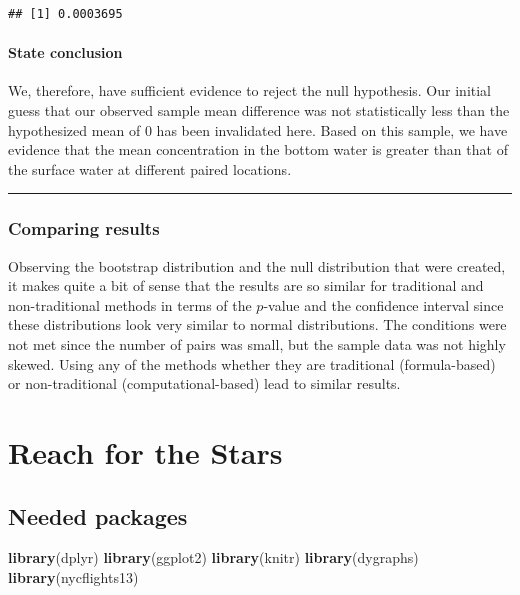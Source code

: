 \documentclass[]{tufte-book}
\newenvironment{Shaded}{\begin{snugshade}}{\end{snugshade}}
\newcommand{\KeywordTok}[1]{\textcolor[rgb]{0.13,0.29,0.53}{\textbf{{#1}}}}
\newcommand{\NormalTok}[1]{{#1}}
\let\oldrule=\rule
\renewcommand{\rule}[1]{\oldrule{\linewidth}}
\theoremstyle{definition}
\theoremstyle{definition}
\theoremstyle{remark}
\begin{document}
\begin{verbatim}
## [1] 0.0003695
\end{verbatim}

\subsubsection{State conclusion}\label{state-conclusion-4}

We, therefore, have sufficient evidence to reject the null hypothesis.
Our initial guess that our observed sample mean difference was not
statistically less than the hypothesized mean of 0 has been invalidated
here. Based on this sample, we have evidence that the mean concentration
in the bottom water is greater than that of the surface water at
different paired locations.

\begin{center}\rule{0.5\linewidth}{\linethickness}\end{center}

\subsection{Comparing results}\label{comparing-results-4}

Observing the bootstrap distribution and the null distribution that were
created, it makes quite a bit of sense that the results are so similar
for traditional and non-traditional methods in terms of the \(p\)-value
and the confidence interval since these distributions look very similar
to normal distributions. The conditions were not met since the number of
pairs was small, but the sample data was not highly skewed. Using any of
the methods whether they are traditional (formula-based) or
non-traditional (computational-based) lead to similar results.

\chapter{Reach for the Stars}\label{appendixC}

\section*{Needed packages}\label{needed-packages-8}

\begin{Shaded}
\begin{Highlighting}[]
\KeywordTok{library}\NormalTok{(dplyr)}
\KeywordTok{library}\NormalTok{(ggplot2)}
\KeywordTok{library}\NormalTok{(knitr)}
\KeywordTok{library}\NormalTok{(dygraphs)}
\KeywordTok{library}\NormalTok{(nycflights13)}
\end{Highlighting}
\end{Shaded}
\end{document}
